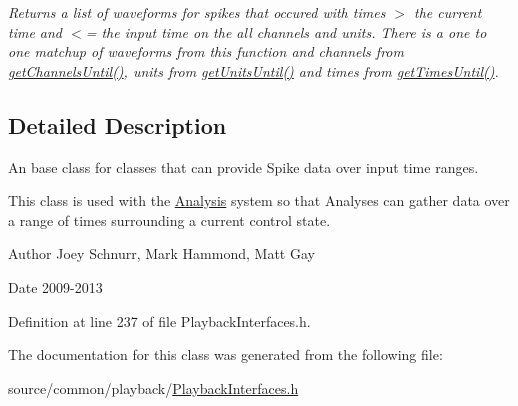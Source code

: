 \begin{DoxyCompactItemize}
\begin{DoxyCompactList}\small\item\em Returns a list of waveforms for spikes that occured with times $>$ the current time and $<$= the input time on the all channels and units. There is a one to one matchup of waveforms from this function and channels from \hyperlink{class_picto_1_1_spike_reader_aa0b0778b7298d76fa3f2d50911fabbd0}{get\-Channels\-Until()}, units from \hyperlink{class_picto_1_1_spike_reader_a0ac51134841226a5dc2172a5a899eea9}{get\-Units\-Until()} and times from \hyperlink{class_picto_1_1_spike_reader_a23634600fe4ee36cf5efe834f0c3823b}{get\-Times\-Until()}. \end{DoxyCompactList}\end{DoxyCompactItemize}


\subsection{Detailed Description}
An base class for classes that can provide Spike data over input time ranges. 

This class is used with the \hyperlink{class_picto_1_1_analysis}{Analysis} system so that Analyses can gather data over a range of times surrounding a current control state. \begin{DoxyAuthor}{Author}
Joey Schnurr, Mark Hammond, Matt Gay 
\end{DoxyAuthor}
\begin{DoxyDate}{Date}
2009-\/2013 
\end{DoxyDate}


Definition at line 237 of file Playback\-Interfaces.\-h.



The documentation for this class was generated from the following file\-:\begin{DoxyCompactItemize}
\item 
source/common/playback/\hyperlink{_playback_interfaces_8h}{Playback\-Interfaces.\-h}\end{DoxyCompactItemize}
